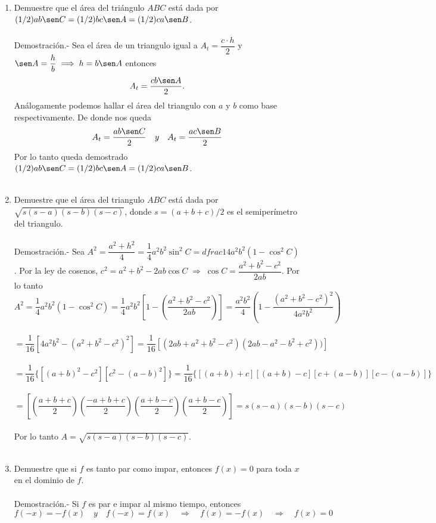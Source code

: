 \begin{enumerate}
\item Demuestre que el área del triángulo $ABC$ está dada por $(1/2)ab \sen C = (1/2) bc \sen A = (1/2)ca \sen B$.\\\\
    Demostración.-\; Sea el área de un triangulo igual a $A_t = \dfrac{c\cdot h}{2}$ y $\sen A = \dfrac{h}{b} \; \Longrightarrow \; h = b\sen A$ entonces $$A_t = \dfrac{cb\sen A}{2}.$$
	Análogamente podemos hallar el área del triangulo con  $a$ y $b$ como base respectivamente. De donde nos queda $$A_t = \dfrac{ab\sen C}{2} \quad y \quad A_t = \dfrac{ac\sen B}{2}$$
	Por lo tanto queda demostrado $(1/2)ab \sen C = (1/2) bc \sen A = (1/2)ca \sen B$.\\\\

\item Demuestre que el área del triangulo $ABC$ está dada por $\sqrt{s(s-a)(s-b)(s-c)}$, donde $s = (a+b+c)/2$ es el semiperímetro del triangulo.\\\\
    Demostración.-\; Sea $A^2 = \dfrac{a^2 + h^2}{4} = \dfrac{1}{4} a^2b^2 \sin^2 C = dfrac{1}{4} a^2 b^2 (1-\cos^2 C)$. Por la ley de cosenos, $c^2 = a^2+b^2-2ab \cos C \; \Longrightarrow \; \cos C = \dfrac{a^2 + b^2 - c^2}{2ab}$. Por lo tanto $$A^2 = \dfrac{1}{4}a^2 b^2 (1-\cos^2 C)= \dfrac{1}{4}a^2b^2\left[1-\left(\dfrac{a^2+b^2-c^2}{2ab}\right)\right] = \dfrac{a^2b^2}{4} \left(1 - \dfrac{(a^2 + b^2 - c^2)^2}{4a^2b^2}\right)$$\\
	$=\dfrac{1}{16}\left[4a^2 b^2 - (a^2 + b^2 - c^2)^2\right] = \dfrac{1}{16}\left[(2ab + a^2 + b^2 - c^2)(2ab - a^2 - b^2 + c^2))\right]$ \\\\
	$= \dfrac{1}{16} \lbrace\left[(a+b)^2 -c^2\right]\left[c^2 - (a-b)^2\right] \rbrace = \dfrac{1}{16} \lbrace \left[(a+b)+c\right] \left[(a+b) -c\right] \left[c+ (a-b)\right] \left[c - (a-b)\right] \rbrace$\\\\
	$=\left[\left(\dfrac{a+b+c}{2}\right) \left(\dfrac{-a+b+c}{2}\right) \left(\dfrac{a+b-c}{2}\right) \left(\dfrac{a+b-c}{2}\right)\right] = s(s-a)(s-b)(s-c)$\\\\
	Por lo tanto $A = \sqrt{s(s-a)(s-b)(s-c)}$.\\\\

\item Demuestre que si $f$ es tanto par como impar, entonces $f(x)=0$ para toda $x$ en el dominio de $f$.\\\\
    Demostración.-\; Si $f$ es par e impar al mismo tiempo, entonces $$f(-x) = -f(x) \quad y \quad f(-x) = f(x) \quad \Longrightarrow \quad f(x) = - f(x) \quad \Longrightarrow \quad f(x) = 0$$\\


\end{enumerate}
